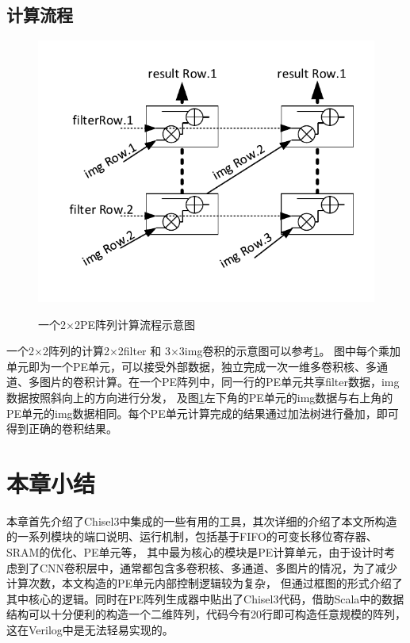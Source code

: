     \subsection{计算流程}
\begin{figure}[h]
    \centering
    \includegraphics{../pdf/PEArray_k.pdf}\\
    \caption{一个2×2PE阵列计算流程示意图}
    \label{pearray_k}
\end{figure}
一个2×2阵列的计算2×2filter 和 3×3img卷积的示意图可以参考\ref{pearray_k}。
图中每个乘加单元即为一个PE单元，可以接受外部数据，独立完成一次一维多卷积核、多通道、多图片的卷积计算。在一个PE阵列中，同一行的PE单元共享filter数据，img数据按照斜向上的方向进行分发，
及图\ref{pearray_k}左下角的PE单元的img数据与右上角的PE单元的img数据相同。每个PE单元计算完成的结果通过加法树进行叠加，即可得到正确的卷积结果。

\section{本章小结}
本章首先介绍了Chisel3中集成的一些有用的工具，其次详细的介绍了本文所构造的一系列模块的端口说明、运行机制，包括基于FIFO的可变长移位寄存器、SRAM的优化、PE单元等，
其中最为核心的模块是PE计算单元，由于设计时考虑到了CNN卷积层中，通常都包含多卷积核、多通道、多图片的情况，为了减少计算次数，本文构造的PE单元内部控制逻辑较为复杂，
但通过框图的形式介绍了其中核心的逻辑。同时在PE阵列生成器中贴出了Chisel3代码，借助Scala中的数据结构可以十分便利的构造一个二维阵列，代码今有20行即可构造任意规模的阵列，
这在Verilog中是无法轻易实现的。

